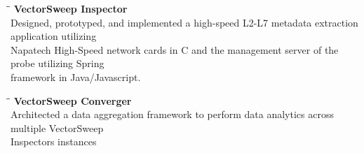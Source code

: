 \documentclass{res}
\begin{document}
\begin{resume}
   \vspace{-10pt}
   \hspace{3pt}{\bf Projects}
	   \vspace{-20pt}
	   \begin{tabbing}
	   	\hspace{0.25in}\= \hspace{0.25in}\= \kill %
	  \> {\bf VectorSweep Inspector} \\	   	   
	   \>\>Designed, prototyped, and implemented a high-speed L2-L7 metadata extraction 
	   application utilizing  \\ \>\> Napatech
	   High-Speed network cards in C and the management server of the probe utilizing Spring \\ \>\> framework in Java/Javascript.
		\end{tabbing}
		\vspace{-30pt}
		
		\begin{tabbing}
			\hspace{0.25in}\= \hspace{0.25in}\= \kill %
			\> {\bf VectorSweep Converger} \\	   	   
			\>\>Architected a data aggregation framework to perform data analytics across multiple VectorSweep \\ \>\> Inspectors instances
		\end{tabbing}
		\vspace{-20pt}
		
	


\end{resume}
\end{document}
